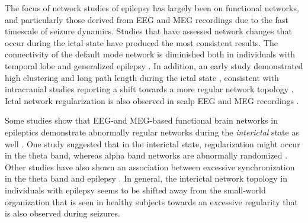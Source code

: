 \documentclass[12pt]{article}
\begin{document}
The focus of network studies of epilepsy has largely been on functional networks, and particularly those derived from EEG and MEG recordings due to the fast timescale of seizure dynamics. Studies that have assessed network changes that occur during the ictal state have produced the most consistent results. The connectivity of the default mode network is diminished both in individuals with temporal lobe and generalized epilepsy \cite{douw2010epilepsy,douw2010functional}. In addition, an early study demonstrated high clustering and long path length during the ictal state \cite{ponten2007small}, consistent with intracranial studies reporting a shift towards a more regular network topology \cite{kramer2008emergent,schindler2008evolving,takahashi2012state}. Ictal network regularization is also observed in scalp EEG and MEG recordings \cite{ponten2009indications,gupta2011space}. 

Some studies show that EEG-and MEG-based functional brain networks in epileptics demonstrate abnormally regular networks during the \emph{interictal} state as well \cite{chavez2010functional,horstmann2010state}. One study suggested that in the interictal state, regularization might occur in the theta band, whereas alpha band networks are abnormally randomized \cite{quraan2013altered}. Other studies have also shown an association between excessive synchronization in the theta band and epilepsy \cite{clemens2013neurophysiology,douw2010epilepsy,douw2010functional}. In general, the interictal network topology in individuals with epilepsy seems to be shifted away from the small-world organization that is seen in healthy subjects towards an excessive regularity that is also observed during seizures.
\end{document}
